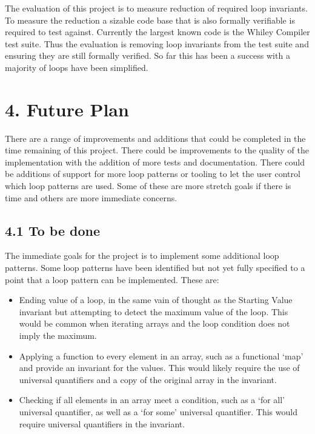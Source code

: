 \documentclass[11pt, a4paper, twoside, openright]{report}
\begin{document}
The evaluation of this project is to measure reduction of required loop
invariants. 
To measure the reduction a sizable code base that is also formally verifiable
is required to test against.
Currently the largest known code is the Whiley Compiler test suite.
Thus the evaluation is removing loop invariants from the test suite and
ensuring they are still formally verified.
So far this has been a success with a majority of loops have been simplified.

\section*{4. Future Plan}

There are a range of improvements and additions that could be completed in
the time remaining of this project.
There could be improvements to the quality of the implementation with
the addition of more tests and documentation.
There could be additions of support for more loop patterns or tooling 
to let the user control which loop patterns are used.
Some of these are more stretch goals if there is time and 
others are more immediate concerns.

\subsection*{4.1 To be done}

The immediate goals for the project is to implement some additional loop
patterns. Some loop patterns have been identified but not yet
fully specified to a point that a loop pattern can be implemented.
These are:
\begin{itemize}
    \item Ending value of a loop, in the same vain of thought as the Starting
        Value invariant but attempting to detect the maximum value of the loop.
        This would be common when iterating arrays and the loop condition does
        not imply the maximum.
    \item Applying a function to every element in an array, such as a
        functional `map' and provide an invariant for the values.
        This would likely require the use of universal quantifiers
        and a copy of the original array in the invariant.
    \item Checking if all elements in an array meet a condition, such as 
        a `for all' universal quantifier, as well as a `for some' universal
        quantifier.
        This would require universal quantifiers in the invariant.
\end{itemize}
\end{document}
